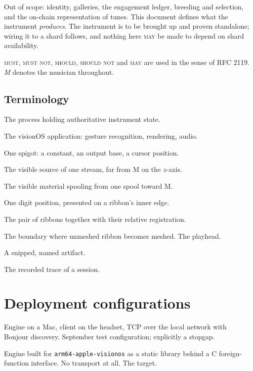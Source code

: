 \documentclass[11pt,a4paper]{article}
\newcommand{\MUST}{\textsc{must}}
\newcommand{\MUSTNOT}{\textsc{must not}}
\newcommand{\SHOULD}{\textsc{should}}
\newcommand{\SHOULDNOT}{\textsc{should not}}
\newcommand{\MAY}{\textsc{may}}
\theoremstyle{definition}
\theoremstyle{plain}
\theoremstyle{remark}
\begin{document}
Out of scope: identity, galleries, the engagement ledger, breeding and selection, and the on-chain
representation of tunes. This document defines what the instrument \emph{produces}. The instrument
is to be brought up and proven standalone; wiring it to a shard follows, and nothing here \MAY{}
be made to depend on shard availability.

\MUST, \MUSTNOT, \SHOULD, \SHOULDNOT{} and \MAY{} are used in the sense of RFC 2119.
\emph{M} denotes the musician throughout.

\subsection{Terminology}

\begin{description}[leftmargin=2.4cm,style=nextline,font=\normalfont\itshape]
\item[Engine] The process holding authoritative instrument state.
\item[Client] The visionOS application: gesture recognition, rendering, audio.
\item[Stream] One spigot: a constant, an output base, a cursor position.
\item[Spool] The visible source of one stream, far from M on the $z$-axis.
\item[Ribbon] The visible material spooling from one spool toward M.
\item[Notch] One digit position, presented on a ribbon's inner edge.
\item[Skein] The pair of ribbons together with their relative registration.
\item[Zip front] The boundary where unmeshed ribbon becomes meshed. The playhead.
\item[Tune] A snipped, named artifact.
\item[Performance] The recorded trace of a session.
\end{description}

\section{Deployment configurations}

\begin{description}[leftmargin=1cm,style=nextline]
\item[\textbf{S1 --- Tethered.}] Engine on a Mac, client on the headset, TCP over the local network
with Bonjour discovery. September test configuration; explicitly a stopgap.
\item[\textbf{S2 --- On-device.}] Engine built for \texttt{arm64-apple-visionos} as a
static library behind a C foreign-function interface. No transport at all. The target.
\end{description}
\end{document}
